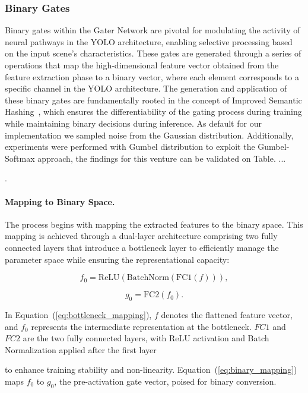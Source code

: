 \subsubsection{Binary Gates}
Binary gates within the Gater Network are pivotal for modulating the activity of neural pathways in the YOLO architecture, enabling selective processing based on the input scene's characteristics. These gates are generated through a series of operations that map the high-dimensional feature vector obtained from the feature extraction phase to a binary vector, where each element corresponds to a specific channel in the YOLO architecture. The generation and application of these binary gates are fundamentally rooted in the concept of Improved Semantic Hashing~\cite{kaiser2018discrete,chen2019you}, which ensures the differentiability of the gating process during training while maintaining binary decisions during inference. As default for our implementation we sampled noise from the Gaussian distribution. Additionally, experiments were performed with Gumbel distribution to exploit the Gumbel-Softmax approach, the findings for this venture can be validated on Table. ... .

\paragraph{Mapping to Binary Space.} The process begins with mapping the extracted features to the binary space. This mapping is achieved through a dual-layer architecture comprising two fully connected layers that introduce a bottleneck layer to efficiently manage the parameter space while ensuring the representational capacity:

\begin{equation}
f_0 = \text{ReLU}(\text{BatchNorm}(\text{FC1}(f))),
\label{eq:bottleneck_mapping}
\end{equation}

\begin{equation}
g_0 = \text{FC2}(f_0).
\label{eq:binary_mapping}
\end{equation}

In Equation~(\ref{eq:bottleneck_mapping}), \(f\) denotes the flattened feature vector, and \(f_0\) represents the intermediate representation at the bottleneck. \(FC1\) and \(FC2\) are the two fully connected layers, with ReLU activation and Batch Normalization applied after the first layer  to enhance training stability and non-linearity. Equation~(\ref{eq:binary_mapping}) maps \(f_0\) to \(g_0\), the pre-activation gate vector, poised for binary conversion.


